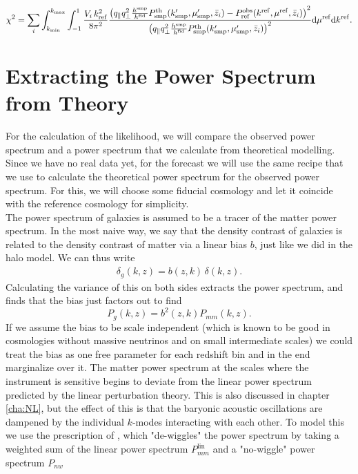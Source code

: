 \documentclass[../main.tex]{subfiles}
\begin{document}
\begin{equation}
   \chi^2 = \sum_i \int_{k_\mathrm{min}}^{k_\mathrm{max}} \int_{-1}^{1} \frac{V_i\, k_\mathrm{ref}^2 }{8 \pi^2} 
    \frac{\left( q_\| q_\perp^2 \frac{h^\mathrm{smp}}{h^\mathrm{fid}} P^\mathrm{th}_\mathrm{smp}(k'_\mathrm{smp}, \mu'_\mathrm{smp},\bar{z}_i)
    -P_\mathrm{ref}^\mathrm{obs}(k^\mathrm{ref},\mu^\mathrm{ref},\bar{z}_i)\right)^2}
    {\left(  q_\| q_\perp^2 \frac{h^\mathrm{smp}}{h^\mathrm{fid}} P^\mathrm{th}_\mathrm{smp}(k'_\mathrm{smp}, \mu'_\mathrm{smp},\bar{z}_i) \right)^2} \mathrm{d} \mu^\mathrm{ref} \mathrm{d} k^\mathrm{ref}.
\end{equation}  

\section{Extracting the Power Spectrum from Theory}
For the calculation of the likelihood, we will compare the observed power spectrum and a power spectrum that we calculate from theoretical modelling. Since we have no real data yet, for the forecast we will use the same recipe that we use to calculate the theoretical power spectrum for the observed power spectrum. For this, we will choose some fiducial cosmology and let it coincide with the reference cosmology for simplicity.\\
The power spectrum of galaxies is assumed to be a tracer of the matter power spectrum. In the most naive way, we say that the density contrast of galaxies is related to the density contrast of matter via a linear bias $b$, just like we did in the halo model. We can thus write
\begin{align*}
    \delta_g(k,z) = b(z,k)\,\delta(k,z).
\end{align*}
Calculating the variance of this on both sides extracts the power spectrum, and finds that the bias just factors out to find  
\begin{equation}
    P_g(k,z) = b^2(z,k) P_{mm}(k,z).
\end{equation}
If we assume the bias to be scale independent (which is known to be good in cosmologies without massive neutrinos and on small intermediate scales) we could treat the bias as one free parameter for each redshift bin and in the end marginalize over it. The matter power spectrum at the scales where the instrument is sensitive begins to deviate from the linear power spectrum predicted by the linear perturbation theory. This is also discussed in chapter \ref{cha:NL}, but the effect of this is that the baryonic acoustic oscillations are dampened by the individual $k$-modes interacting with each other. To model this we use the prescription of  \cite{Euclid:2019clj}, which "de-wiggles" the power spectrum by taking a weighted sum of the linear power spectrum $P_{mm}^\mathrm{lin}$ and a "no-wiggle" power spectrum $P_{nw}$
\end{document}
